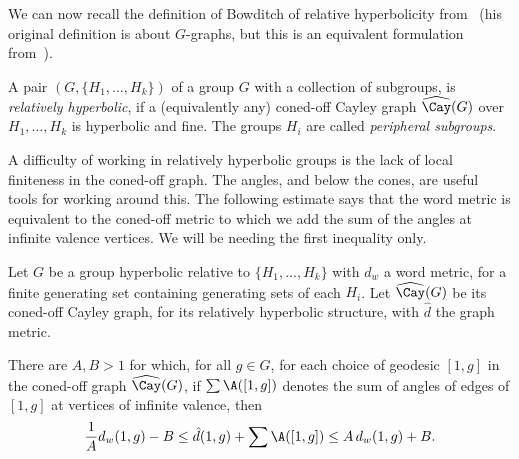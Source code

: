 We can now recall the definition of Bowditch of relative hyperbolicity from~\cite{BowRH} (his original definition is about $G$-graphs, but this is an equivalent formulation from~\cite[Appendix]{Dthesis}).

\begin{defi}
A pair $(G,\{H_1, \dots, H_k\})$ of a group $G$ with a collection of subgroups, is \emph{relatively hyperbolic}, if a (equivalently any) coned-off Cayley graph $\widehat{{\Cay}} (G)$ over $H_1, \dots,H_k$ is hyperbolic and fine. The groups $H_i$ are called \emph{peripheral subgroups}.
\end{defi}

A difficulty of working in relatively hyperbolic groups is the lack of local finiteness in the coned-off graph. The angles, and below the cones, are useful tools for working around this. The following estimate says that the word metric is equivalent to the coned-off metric to which we add the sum of the angles at infinite valence vertices. We will be needing the first inequality only.

\begin{prop}\label{prop;pseudo_word_metric}
Let $G$ be a group hyperbolic relative to $\{H_1, \dots, H_k\}$ with $d_w$ a word metric, for a finite generating set containing generating sets of each $H_i$. Let $\widehat{{\Cay}} (G)$ be its coned-off Cayley graph, for its relatively hyperbolic structure, with $\hat{d}$ the graph metric.

There are $A,B>1$ for which, for all $g\in G$, for each choice of geodesic $[1,g]$ in the coned-off graph $\widehat{{\Cay}} (G)$, if $\sum\A ([1,g])$ denotes the sum of angles of edges of $[1,g]$ at vertices of infinite valence, then
\[
\frac1A d_w(1,g) -B \leq \hat{d}(1,g) + \sum\A ([1,g]) \leq A\,d_w(1,g) +B.
\]
\end{prop}

